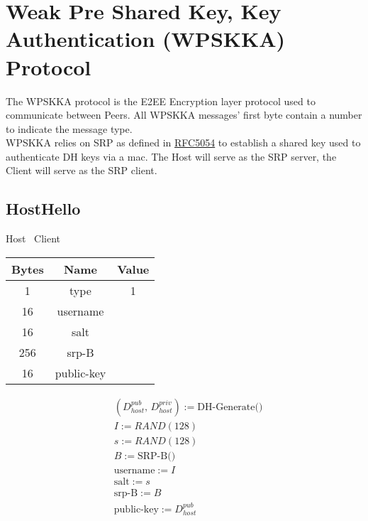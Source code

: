 \section{Weak Pre Shared Key, Key Authentication (WPSKKA) Protocol}

The WPSKKA protocol is the E2EE Encryption layer protocol used to communicate between Peers. All WPSKKA messages'
first byte contain a number to indicate
the message type.\\

WPSKKA relies on SRP as defined in \href{https://datatracker.ietf.org/doc/html/rfc5054}{RFC5054} to establish a
shared key used to authenticate DH keys via a mac. The Host will serve as the SRP server, the Client will serve as the SRP
client.\\

\subsection{HostHello}

\begin{center}
    Host \textrightarrow\ Client\\
    \begin{tabular}{|c|c|c|}
        \hline
        \textbf{Bytes} & \textbf{Name} & \textbf{Value} \\
        \hline
        1              & type          & 1              \\
        \hline
        16             & username      &                \\
        \hline
        16             & salt          &                \\
        \hline
        256            & srp-B         &                \\
        \hline
        16             & public-key    &                \\
        \hline
    \end{tabular}
\end{center}

\begin{align*}
    & (D_{host}^{pub},\, D_{host}^{priv}) := \text{DH-Generate()}\\
    & I := RAND(128)\\
    & s := RAND(128)\\
    & B := \text{SRP-B()}\\
    & \text{username} := I\\
    & \text{salt} := s\\
    & \text{srp-B} := B\\
    & \text{public-key} := D_{host}^{pub}\\
\end{align*}

